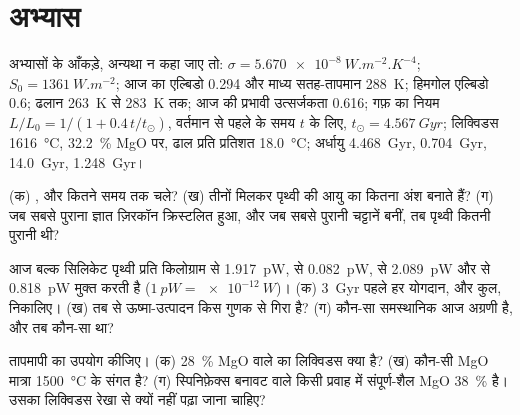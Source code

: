 \section*{अभ्यास}\label{sec:b2:precambrian-earth:exercises}

अभ्यासों के आँकड़े, अन्यथा न कहा जाए तो: $\sigma = \qty{5.670e-8}{W.m^{-2}.K^{-4}}$;
$S_0 = \qty{1361}{W.m^{-2}}$; आज का एल्बिडो 0.294 और माध्य सतह-तापमान \qty{288}{K};
हिमगोल एल्बिडो 0.6; ढलान \qty{263}{K} से \qty{283}{K} तक; आज की प्रभावी उत्सर्जकता
0.616; गफ़ का नियम $L/L_0 = 1/(1 + 0.4\,t/t_\odot)$, वर्तमान से पहले के समय $t$ के लिए, $t_\odot =
\qty{4.567}{Gyr}$;  लिक्विडस \qty{1616}{\celsius}, \qty{32.2}{\percent} MgO पर,
ढाल प्रति प्रतिशत \qty{18.0}{\celsius}; अर्धायु  \qty{4.468}{Gyr}, 
\qty{0.704}{Gyr},  \qty{14.0}{Gyr},  \qty{1.248}{Gyr}।

\begin{exercise}[$\star$]\label{exo:b2:precambrian-earth:1}
(क) ,  और  कितने समय तक चले? (ख) तीनों मिलकर पृथ्वी की आयु का
कितना अंश बनाते हैं? (ग) जब सबसे पुराना ज्ञात ज़िरकॉन क्रिस्टलित हुआ, और जब सबसे पुरानी चट्टानें बनीं,
तब पृथ्वी कितनी पुरानी थी?
\end{exercise}

\begin{exercise}[$\star$]\label{exo:b2:precambrian-earth:2}
आज बल्क सिलिकेट पृथ्वी प्रति किलोग्राम  से \qty{1.917}{pW},
 से \qty{0.082}{pW},  से \qty{2.089}{pW} और
 से \qty{0.818}{pW} मुक्त करती है ($\qty{1}{pW} = \qty{e-12}{W}$)। (क) \qty{3}{Gyr} पहले हर योगदान, और
कुल, निकालिए। (ख) तब से ऊष्मा-उत्पादन किस गुणक से गिरा है? (ग) कौन-सा समस्थानिक
आज अग्रणी है, और तब कौन-सा था?
\end{exercise}

\begin{exercise}[$\star$]\label{exo:b2:precambrian-earth:3}
 तापमापी का उपयोग कीजिए। (क) \qty{28}{\percent} MgO वाले  का
लिक्विडस क्या है? (ख) कौन-सी MgO मात्रा \qty{1500}{\celsius} के संगत है? (ग) स्पिनिफ़ेक्स बनावट वाले
किसी प्रवाह में संपूर्ण-शैल MgO \qty{38}{\percent} है। उसका लिक्विडस रेखा से क्यों नहीं
पढ़ा जाना चाहिए?
\end{exercise}

